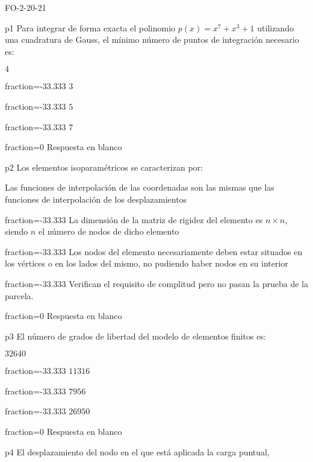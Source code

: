 \documentclass[a4paper]{article}
\begin{document}
\begin{quiz}{FO-2-20-21}

\begin{multi}{p1}
Para integrar de forma exacta el polinomio $p(x)=x^7+x^3+1$ utilizando
una cuadratura de Gauss, el m\'inimo n\'umero de puntos de integraci\'on necesario
es:
	\item* $4$
	\item[fraction=-33.333] $3$
	\item[fraction=-33.333] $5$
	\item[fraction=-33.333] $7$
	\item[fraction=0] Respuesta en blanco
\end{multi}
\begin{multi}{p2}
Los elementos isoparam\'etricos se caracterizan por:
	\item* Las funciones de interpolaci\'on de las coordenadas
	son las mismas que las funciones de interpolaci\'on de los desplazamientos
	\item[fraction=-33.333] La dimensi\'on de la matriz de rigidez del elemento
	es $n \times n$, siendo $n$ el n\'umero de nodos de dicho elemento
	\item[fraction=-33.333] Los nodos del elemento necesariamente deben estar
	situados en los v\'ertices o en los lados del mismo, no pudiendo haber nodos
	en su interior
	\item[fraction=-33.333] Verifican el requisito de complitud pero no pasan
	la prueba de la parcela.
	\item[fraction=0] Respuesta en blanco
\end{multi}
\begin{multi}{p3}
	El n\'umero de grados de libertad del modelo de elementos finitos es:
	\item* $32640$
	\item[fraction=-33.333] $11316$
	\item[fraction=-33.333] $7956$
	\item[fraction=-33.333] $26950$
	\item[fraction=0] Respuesta en blanco
\end{multi}
\begin{multi}{p4}
	El desplazamiento del nodo en el que est\'a aplicada la carga puntual,

\end{multi}
\end{quiz}
\end{document}

